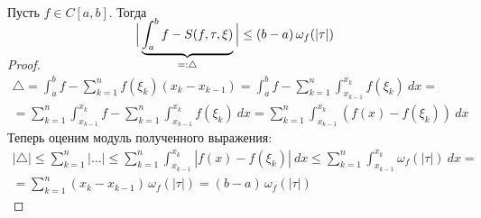 \begin{theorem}
    Пусть $f \in C[a, b]$. Тогда
    \begin{equation*}
    \smash{\Big{|} \underbrace{\int_{a}^{b} f - S(f, \tau, \xi)}_
    {=: \triangle}\Big{|}}
    \leq (b - a)\, \omega_f (|\tau|)
    \end{equation*}
\end{theorem}
\begin{proof}
  \begin{equation*}
    \begin{gathered}
      \triangle = \int_{a}^{b} f - \sum_{k = 1}^{n} f (\xi_k)
      (x_k - x_{k - 1}) = \int_{a}^{b} f - \sum_{k = 1}^{n}
      \int_{x_{k - 1}}^{x_k} f(\xi_k) \: dx
      = \\ =
      \sum_{k = 1}^{n} \int_{x_{k - 1}}^{x_k} f -
      \sum_{k = 1}^{n} \int_{x_{k - 1}}^{x_k} f(\xi_k) \: dx =
      \sum_{k = 1}^{n} \int_{x_{k - 1}}^{x_k} (f(x) - f(\xi_k)) \: dx
    \end{gathered}
  \end{equation*}
  Теперь оценим модуль полученного выражения:
  \begin{equation*}
    \begin{gathered}
      |\triangle| \leq \sum_{k = 1}^{n} \Big| \dotso \Big| \leq
      \sum_{k = 1}^{n} \int_{x_{k - 1}}^{x_k} |f(x) - f(\xi_k)| \: dx \leq
      \sum_{k = 1}^{n} \int_{x_{k - 1}}^{x_k} \omega_f(|\tau|) \: dx
      = \\ =
      \sum_{k = 1}^{n} (x_k - x_{k - 1})\, \omega_f(|\tau|) = (b - a)\, \omega_f(|\tau|)
    \end{gathered}
  \end{equation*}
\end{proof}

